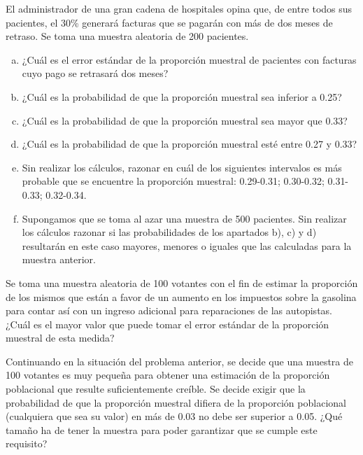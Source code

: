 \documentclass[12pt]{article}\usepackage[]{graphicx}\usepackage[]{color}
\begin{document}
\begin{prob}
El administrador de una gran cadena de hospitales opina que, de
entre todos sus pacientes, el 30\% generará facturas que se pagarán
con más de dos meses de retraso. Se toma una muestra aleatoria de 200
pacientes.
\begin{enumerate}[a)]
\item ¿Cuál es el error estándar de la proporción muestral de
pacientes con facturas cuyo pago se retrasará dos meses?
\item ¿Cuál es la probabilidad de que la proporción muestral sea
inferior a   0.25?
\item  ¿Cuál es la probabilidad de que la proporción muestral sea
mayor que 0.33?
\item  ¿Cuál es la probabilidad de que la proporción muestral esté
entre 0.27 y 0.33?
\item Sin realizar los cálculos, razonar en cuál de los siguientes
intervalos es más probable que se encuentre la proporción
muestral: 0.29-0.31; 0.30-0.32; 0.31-0.33; 0.32-0.34.
\item Supongamos que se toma al azar una muestra de 500 pacientes.
Sin realizar los cálculos razonar si las probabilidades de los
apartados b), c)  y d) resultarán en este caso mayores, menores o iguales
que las calculadas para la muestra anterior.
\end{enumerate}
\end{prob}

\begin{prob}
Se toma una muestra aleatoria de 100 votantes con el fin
de estimar la proporción de los mismos que están a favor de
un aumento en los impuestos sobre la gasolina para contar
así con un ingreso adicional para reparaciones de las
autopistas.  ¿Cuál es el mayor valor que puede tomar el
error estándar de la proporción muestral de esta medida?
\end{prob}

\begin{prob}
Continuando en la situación del problema anterior, se decide que
una muestra de 100 votantes es muy pequeña para obtener una
estimación de la proporción poblacional que resulte
suficientemente creíble. Se decide exigir que la probabilidad de
que la proporción muestral difiera de la proporción poblacional
(cualquiera que sea su valor) en más de 0.03 no debe ser superior
a 0.05. ¿Qué tamaño ha de tener la muestra para poder garantizar
que se cumple este requisito?
\end{prob}
\end{document}
